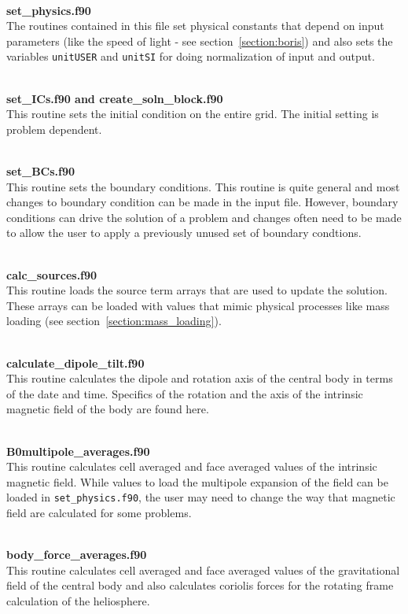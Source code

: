 \ \ \\
{\bf set\_physics.f90} \\
The routines contained in this file set physical constants that depend on
input parameters (like the speed of light - see section~\ref{section:boris})
and also sets the variables  {\tt unitUSER} and {\tt unitSI} for doing 
normalization of input and output.

\ \ \\
{\bf set\_ICs.f90 and create\_soln\_block.f90} \\
This routine sets the initial condition on the entire grid.  The initial setting
is problem dependent.

\ \ \\
{\bf set\_BCs.f90} \\
This routine sets the boundary conditions.  This routine is quite general and
most changes to boundary condition can be made in the input file.  However,
boundary conditions can drive the solution of a problem and changes often
need to be made to allow the user to apply a previously unused set of boundary
condtions.

\ \ \\
{\bf calc\_sources.f90} \\
This routine loads the source term arrays that are used to update the solution.
These arrays can be loaded with values that mimic physical processes like mass
loading (see section~\ref{section:mass_loading}). 

\ \ \\
{\bf calculate\_dipole\_tilt.f90} \\
This routine calculates the dipole and rotation axis of the central body in
terms of the date and time.  Specifics of the rotation and the axis of the intrinsic
magnetic field of the body are found here.

\ \ \\
{\bf B0multipole\_averages.f90} \\
This routine calculates cell averaged and face averaged values of the intrinsic
magnetic field.  While values to load the multipole expansion of the field can
be loaded in {\tt set\_physics.f90}, the user may need to change the way that
magnetic field are calculated for some problems.

\ \ \\ 
{\bf body\_force\_averages.f90} \\
This routine calculates cell averaged and face averaged values of the 
gravitational field of the central body and also calculates coriolis forces for
the rotating frame calculation of the heliosphere.

